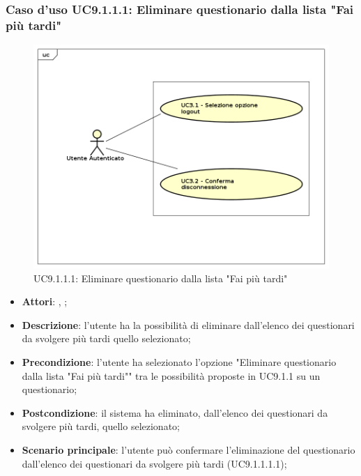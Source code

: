 				\subsubsection{Caso d'uso UC9.1.1.1: Eliminare questionario dalla lista "Fai più tardi"}
				\label{UC9.1.4.1}
				\begin{figure}[h]
					\centering
					\includegraphics[scale=0.7,keepaspectratio]{UML/UC9.png}
					\caption{UC9.1.1.1: Eliminare questionario dalla lista "Fai più tardi"}
				\end{figure}
				\FloatBarrier
				\begin{itemize}
					\item \textbf{Attori}: \uau, \uaupro;
					\item \textbf{Descrizione}: l'utente ha la possibilità di eliminare dall'elenco dei questionari da svolgere più tardi quello selezionato;
					\item \textbf{Precondizione}: l'utente ha selezionato l'opzione "Eliminare questionario dalla lista "Fai più tardi"" tra le possibilità proposte in UC9.1.1 su un questionario;
					\item \textbf{Postcondizione}: il sistema ha eliminato, dall'elenco dei questionari da svolgere più tardi, quello selezionato;
					\item \textbf{Scenario principale}: l'utente può confermare l'eliminazione del questionario dall'elenco dei questionari da svolgere più tardi (UC9.1.1.1.1);
					
				\end{itemize}
				
